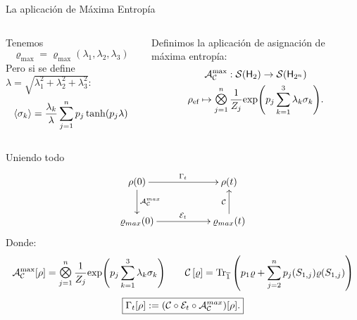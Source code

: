 \begin{frame}{La aplicación de Máxima Entropía}
    \begin{columns}
        \begin{column}{0.5\textwidth}
            Tenemos
            \begin{equation}
                \varrho_{\max}=\varrho_{\max}(\lambda_{1},\lambda_{2},\lambda_{3})\nonumber
            \end{equation}\pause
            Pero si se define $\lambda=\sqrt{\lambda_{1}^{2}+\lambda_{2}^{2}+\lambda_{3}^{2}}$\pause:
            \begin{equation}
                \expval{\sigma_{k}}=\frac{\lambda_{k}}{\lambda}\sum_{j=1}^{n}p_{j}\tanh(p_{j}\lambda)\nonumber
            \end{equation}
        \end{column}
        \pause
        \begin{column}{0.5\textwidth}
            Definimos la aplicación de asignación de máxima entropía:
            \begin{equation}
                \begin{gathered}
                    \mcA_{\mcC}^{\max}:\densityspace{2}\rightarrow\densityspace{2^{n}}\nonumber\\
                    \rho_{\ef} \mapsto \Motimes_{j=1}^{n}\frac{1}{Z_{j}}\text{exp}\qty(p_{j}\sum_{k=1}^{3}\lambda_{k}\sigma_{k}).
                \end{gathered}
            \end{equation}
        \end{column}
    \end{columns}
\end{frame}


\begin{frame}{Uniendo todo}
    \begin{displaymath}
        \xymatrix{
          {\rho(0)} \ar[rr]^{\Gamma_{t}} \ar[d]^{\mcA^{max}_{\mcC}}
          && {\rho(t)}\\
          {\varrho_{max}(0)} \ar[rr]^{\mcE_{t}}
          && {\varrho_{max}(t)} \ar[u]^{\mcC}
        }
      \end{displaymath}\pause
      Donde:
        \begin{equation}
            \mcA_{\mcC}^{\max}[\rho]=\Motimes_{j=1}^{n}\frac{1}{Z_{j}}\text{exp}\qty(p_{j}\sum_{k=1}^{3}\lambda_{k}\sigma_{k}) \qquad \CG{\varrho}=\Tr_{\overline{1}}\qty(p_{1}\varrho+\sum_{j=2}^{n}p_{j}(S_{1,j})\varrho(S_{1,j}))\nonumber
        \end{equation}\pause
        \begin{equation}
            \boxed{\Gamma_t[\rho]:=(\mathcal{C} \circ \mathcal{E}_t \circ \mathcal{A}^{max}_{\mathcal{C}})[\rho].}\nonumber
        \end{equation}
\end{frame}
